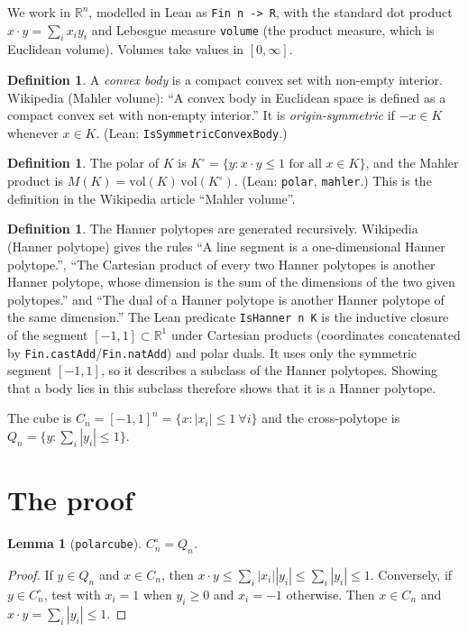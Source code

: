 \documentclass[11pt]{article}
\newtheorem{lemma}[theorem]{Lemma}
\theoremstyle{definition}
\newtheorem{definition}[theorem]{Definition}
\theoremstyle{remark}
\renewcommand{\_}{\oldus\allowbreak}
\begin{document}
We work in $\mathbb{R}^n$, modelled in Lean as \texttt{Fin n -> R}, with the standard dot product
$x\cdot y=\sum_i x_iy_i$ and Lebesgue measure \texttt{volume} (the product measure, which is
Euclidean volume). Volumes take values in $[0,\infty]$.

\begin{definition}
A \emph{convex body} is a compact convex set with non-empty interior. Wikipedia (Mahler volume):
``A convex body in Euclidean space is defined as a compact convex set with non-empty interior.''
It is \emph{origin-symmetric} if $-x\in K$ whenever $x\in K$. (Lean:
\texttt{IsSymmetricConvexBody}.)
\end{definition}

\begin{definition}
The polar of $K$ is $K^\circ=\{y : x\cdot y\le 1 \text{ for all } x\in K\}$, and the Mahler product
is $M(K)=\mathrm{vol}(K)\,\mathrm{vol}(K^\circ)$. (Lean: \texttt{polar}, \texttt{mahler}.) This is
the definition in the Wikipedia article ``Mahler volume''.
\end{definition}

\begin{definition}
The Hanner polytopes are generated recursively. Wikipedia (Hanner polytope) gives the rules
``A line segment is a one-dimensional Hanner polytope.'', ``The Cartesian product of every two
Hanner polytopes is another Hanner polytope, whose dimension is the sum of the dimensions of the
two given polytopes.'' and ``The dual of a Hanner polytope is another Hanner polytope of the same
dimension.'' The Lean predicate \texttt{IsHanner n K} is the inductive closure of the segment
$[-1,1]\subset\mathbb{R}^1$ under Cartesian products (coordinates concatenated by
\texttt{Fin.castAdd}/\texttt{Fin.natAdd}) and polar duals. It uses only the symmetric segment
$[-1,1]$, so it describes a subclass of the Hanner polytopes. Showing that a body lies in this
subclass therefore shows that it is a Hanner polytope.
\end{definition}

\noindent The cube is $C_n=[-1,1]^n=\{x:|x_i|\le 1\ \forall i\}$ and the cross-polytope is
$Q_n=\{y:\sum_i|y_i|\le1\}$.

\section{The proof}

\begin{lemma}[\texttt{polar\_cube}]
$C_n^\circ = Q_n$.
\end{lemma}
\begin{proof}
If $y\in Q_n$ and $x\in C_n$, then $x\cdot y\le\sum_i|x_i||y_i|\le\sum_i|y_i|\le1$. Conversely, if
$y\in C_n^\circ$, test with $x_i=1$ when $y_i\ge0$ and $x_i=-1$ otherwise. Then $x\in C_n$ and
$x\cdot y=\sum_i|y_i|\le1$.
\end{proof}
\end{document}

